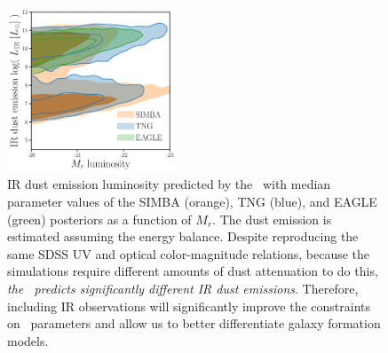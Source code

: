 


\begin{figure}
\begin{center}
    \includegraphics[width=0.45\textwidth]{figs/abc_Lir.pdf}
    \caption{\label{fig:lir}
    IR dust emission luminosity predicted by the \eda~with median parameter
    values of the SIMBA (orange), TNG (blue), and EAGLE (green) posteriors as a
    function of $M_r$. 
    The dust emission is estimated assuming the \cite{dacunha2008} energy balance.
    Despite reproducing the same SDSS UV and optical color-magnitude relations,
    because the simulations require different amounts of dust attenuation to do
    this, \emph{the \eda~predicts significantly different IR dust emissions}.
    Therefore, including IR observations will significantly improve the
    constraints on \eda~parameters and allow us to better differentiate galaxy
    formation models.
    }
\end{center}
\end{figure}

